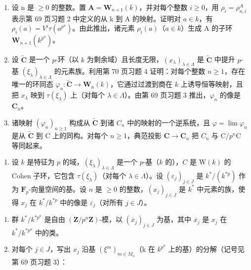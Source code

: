 \begin{enumerate}
\def\labelenumi{\alph{enumi})}
\item
  设 n 是 \(\geqslant 0\) 的整数。置 \(\mathbf{A} = \mathbf{W}_{n+1}(k)\)，并对每个整数 \(i \geqslant 0\)，用 \(\rho_{i} = \rho_{n,i}^{A}\) 表示第 69 页习题 2 中定义的从 k 到 A 的映射。证明对 \(a \in k\)，有 \(\rho_{i}(a) = V^{i}\tau(a^{p^{n}})\)。由此推出，诸元素 \(\rho_{i}(a)\)（\(a \in k\)）生成 A 的子环 \(\mathbf{W}_{n+1}(k^{p^{n}})\)。
\item
  设 \(\tilde{\mathbf{C}}\) 是一个 \(p\)-环（以 \(k\) 为剩余域）且长度无限，\((x_{\lambda})_{\lambda \in \Lambda}\) 是 \(\tilde{\mathbf{C}}\) 中提升 \(p\)-基 \((\xi_{\lambda})_{\lambda \in \Lambda}\) 的元素族。利用第 70 页习题 4 证明：对每个整数 \(n \geqslant 1\)，存在唯一的环同态 \(\varphi_n: \tilde{\mathbf{C}} \to \mathbf{W}_n(k)\)，它通过过渡到商在 \(k\) 上诱导恒等映射，且把 \(x_{\lambda}\) 映到 \(\tau(\xi_{\lambda})\) 上（对每个 \(\lambda \in \Lambda\)）。由第 69 页习题 3 推出，\(\varphi_n\) 的像是 \(\mathbf{C}_n\)。
\item
  诸映射 \((\varphi_n)_{n\geqslant 1}\) 构成从 \(\tilde{\mathbf{C}}\) 到诸 \(C_n\) 中的映射的一个逆系统，且 \(\varphi = \lim \varphi_n\) 是从 \(\tilde{\mathbf{C}}\) 到 C 上的同构。对每个 \(n\geqslant 1\)，典范投影 \(\mathbf{C}\to \mathbf{C}_n\) 把 \(C_n\) 与 \(\mathrm{C} / p^n\mathrm{C}\) 等同起来。
\end{enumerate}

\begin{enumerate}
\def\labelenumi{\arabic{enumi})}
\setcounter{enumi}{10}
\tightlist
\item
  设 \(k\) 是特征为 \(p\) 的域，\((\xi_{\lambda})_{\lambda \in \Lambda}\) 是一个 \(p\)-基（\(k\) 的），\(C\) 是 \(\mathrm{W}(k)\) 的 Cohen 子环，它包含 \(\tau(\xi_{\lambda})\)（对每个 \(\lambda \in \Lambda\)）。设 \((\varepsilon_j)_{j \in J}\) 是 \(k^*/(k^{*p})\) 作为 \(\mathbf{F}_p\)-向量空间的基。设 \(n\) 是 \(\geqslant 0\) 的整数，\((x_j)_{j \in J}\) 是 \(k^*\) 中元素的族，使得 \(x_j\) 在 \(k^*/k^{*p}\) 中的像是 \(\varepsilon_j\)（对所有 \(j \in J\)）。
\end{enumerate}

\begin{enumerate}
\def\labelenumi{\alph{enumi})}
\item
  群 \(k^{*} / k^{*p^{n}}\) 是自由 \((\mathbf{Z} / p^{n}\mathbf{Z})\)-模，以 \((\overline{x}_j)_{j\in J}\) 为基，其中 \(\overline{x}_j\) 是 \(x_j\) 在 \(k^{*} / k^{*p^{n}}\) 中的类。
\item
  对每个 \(j \in J\)，写出 \(x_{j}\) 沿基 \((\xi^{m})_{m \in M_{n}}\)（k 在 \(k^{p^{n}}\) 上的基）的分解（记号见第 69 页习题 3）：
\end{enumerate}

